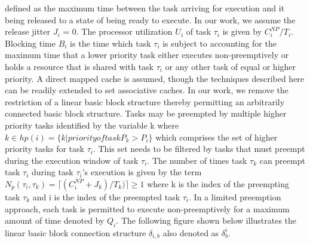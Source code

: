 defined as the maximum time between the task arriving for execution and it being released to a state of being ready to execute.  In our work, we assume the release jitter \begin{math}J_{i}\end{math} = 0.  The processor utilization \begin{math}U_{i}\end{math} of task \begin{math}\tau_{i}\end{math} is given by \begin{math}C_{i}^{NP}/T_{i}\end{math}. Blocking time \begin{math}B_{i}\end{math} is the time which task \begin{math}\tau_{i}\end{math} is subject to accounting for the maximum time that a lower priority task either executes non-preemptively or holds a resource that is shared with task \begin{math}\tau_{i}\end{math} or any other task of equal or higher priority.  A direct mapped cache is assumed, though the techniques described here can be readily extended to set associative caches.  In our work, we remove the restriction of a linear basic block structure thereby permitting an arbitrarily connected basic block structure.  Tasks may be preempted by multiple higher priority tasks identified by the variable k where \begin{math}k \in hp(i) = \{k | priority of task P_{k} > P_{i}\}\end{math} which comprises the set of higher priority tasks for task \begin{math}\tau_{i}\end{math}.  This set needs to be filtered by tasks that must preempt during the execution window of task \begin{math}\tau_{i}\end{math}.  The number of times task \begin{math}\tau_{k}\end{math} can preempt task \begin{math}\tau_{i}\end{math} during task \begin{math}\tau_{i}\end{math}'s execution is given by the term \begin{math}N_{p}(\tau_{i},\tau_{k})=\lceil(C_{i}^{NP} + J_{k})/T_{k})\rceil \geq 1 \end{math} where k is the index of the preempting task \begin{math}\tau_{k}\end{math} and i is the index of the preempted task \begin{math}\tau_{i}\end{math}.  In a limited preemption approach, each task is permitted to execute non-preemptively for a maximum amount of time denoted by \begin{math}Q_{i}\end{math}.  The following figure shown below illustrates the linear basic block connection structure \begin{math}\delta_{i,b}\end{math} also denoted as \begin{math}\delta_{b}^{i}\end{math}.

